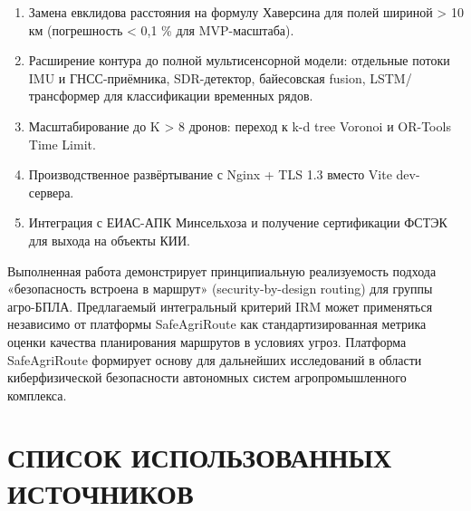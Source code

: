 \documentclass[14pt,a4paper]{extarticle}
\providecommand{\tightlist}{%
  \setlength{\itemsep}{0pt}\setlength{\parskip}{0pt}}
\begin{document}
\begin{enumerate}
\def\labelenumi{\arabic{enumi}.}
\tightlist
\item
  Замена евклидова расстояния на формулу Хаверсина для полей шириной \textgreater{} 10 км (погрешность \textless{} 0,1 \% для MVP-масштаба).
\item
  Расширение контура до полной мультисенсорной модели: отдельные потоки IMU и ГНСС-приёмника, SDR-детектор, байесовская fusion, LSTM/трансформер для классификации временных рядов.
\item
  Масштабирование до K \textgreater{} 8 дронов: переход к k-d tree Voronoi и OR-Tools Time Limit.
\item
  Производственное развёртывание с Nginx + TLS 1.3 вместо Vite dev-сервера.
\item
  Интеграция с ЕИАС-АПК Минсельхоза и получение сертификации ФСТЭК для выхода на объекты КИИ.
\end{enumerate}

Выполненная работа демонстрирует принципиальную реализуемость подхода «безопасность встроена в маршрут» (security-by-design routing) для группы агро-БПЛА. Предлагаемый интегральный критерий IRM может применяться независимо от платформы SafeAgriRoute как стандартизированная метрика оценки качества планирования маршрутов в условиях угроз. Платформа SafeAgriRoute формирует основу для дальнейших исследований в области киберфизической безопасности автономных систем агропромышленного комплекса.


\hypertarget{ux441ux43fux438ux441ux43eux43a-ux438ux441ux43fux43eux43bux44cux437ux43eux432ux430ux43dux43dux44bux445-ux438ux441ux442ux43eux447ux43dux438ux43aux43eux432}{%
\section{СПИСОК ИСПОЛЬЗОВАННЫХ ИСТОЧНИКОВ}\label{ux441ux43fux438ux441ux43eux43a-ux438ux441ux43fux43eux43bux44cux437ux43eux432ux430ux43dux43dux44bux445-ux438ux441ux442ux43eux447ux43dux438ux43aux43eux432}}
\end{document}
